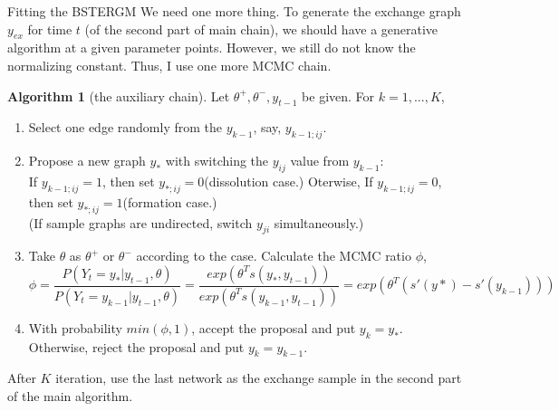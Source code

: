 \documentclass[aspectratio=169,ignorenonframetext,9pt]{beamer}
\theoremstyle{plain}
\theoremstyle{definition}
\newtheorem{algo}{Algorithm}[section]
\begin{document}
\begin{frame}{Fitting the BSTERGM}
    We need one more thing. To generate the exchange graph $y_{ex}$ for time $t$ (of the second part of main chain), 
    we should have a generative algorithm at a given parameter points.
    However, we still do not know the normalizing constant. Thus, I use one more MCMC chain.
    \begin{algo}[the auxiliary chain]
    Let $\theta^+,\theta^-,y_{t-1}$ be given. For $k=1,...,K$,
    \begin{enumerate}
        \item Select one edge randomly from the $y_{k-1}$, say, $y_{k-1;ij}$.
        \item Propose a new graph $y_*$ with switching the $y_{ij}$ value from $y_{k-1}$: 
        \\ If $y_{k-1;ij}=1$, then set $y_{*;ij}=0$(dissolution case.) Oterwise, If $y_{k-1;ij}=0$, then set $y_{*;ij}=1$(formation case.)
        \\ (If sample graphs are undirected, switch $y_{ji}$ simultaneously.)
        \item Take $\theta$ as $\theta^+$ or $\theta^-$ according to the case. Calculate the MCMC ratio $\phi$,
        \[\phi = \frac{P(Y_t=y_*|y_{t-1},\theta)}{P(Y_t=y_{k-1}|y_{t-1},\theta)}= \frac{exp(\theta^T s(y_*,y_{t-1}))}{exp(\theta^T s(y_{k-1},y_{t-1}))} = exp(\theta^T (s'(y*)-s'(y_{k-1})))\]
        \item With probability $min(\phi,1)$, accept the proposal and put $y_k=y_*$.\\
            Otherwise, reject the proposal and put $y_k=y_{k-1}$.
    \end{enumerate}
    \end{algo}
    After $K$ iteration, use the last network as the exchange sample in the second part of the main algorithm.
\end{frame}
\end{document}
